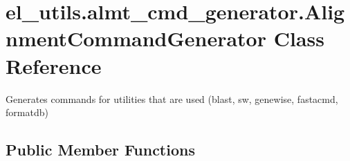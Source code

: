 \hypertarget{classel__utils_1_1almt__cmd__generator_1_1AlignmentCommandGenerator}{\section{el\-\_\-utils.\-almt\-\_\-cmd\-\_\-generator.\-Alignment\-Command\-Generator Class Reference}
\label{classel__utils_1_1almt__cmd__generator_1_1AlignmentCommandGenerator}
}


Generates commands for utilities that are used (blast, sw, genewise, fastacmd, formatdb)  


\subsection*{Public Member Functions}
